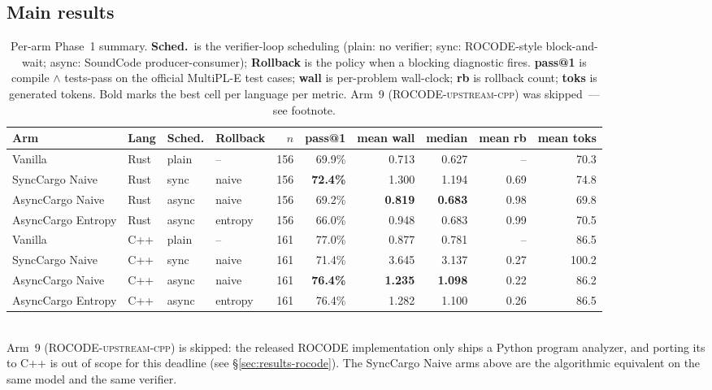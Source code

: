 \subsection{Main results}\label{sec:main-results}

\begin{table}[t]
\centering
\small
\setlength{\tabcolsep}{3.5pt}
\caption{Per-arm Phase~1 summary. \textbf{Sched.}\ is the
verifier-loop scheduling (\textsf{plain}: no verifier; \textsf{sync}:
ROCODE-style block-and-wait; \textsf{async}: SoundCode
producer-consumer); \textbf{Rollback} is the policy when a blocking
diagnostic fires. \textbf{pass@1} is compile $\wedge$ tests-pass on
the official MultiPL-E test cases; \textbf{wall} is per-problem
wall-clock; \textbf{rb} is rollback count; \textbf{toks} is generated
tokens. Bold marks the best cell per language per metric. Arm~9
(\textsc{ROCODE-upstream-cpp}) was skipped~--- see footnote.}
\label{tab:main}
\begin{tabular}{llllrrrrrr}
\toprule
Arm & Lang & Sched. & Rollback & $n$ & pass@1 & mean wall & median & mean rb & mean toks \\
\midrule
Vanilla            & Rust & plain  & --      & 156 & 69.9\%          & 0.713          & 0.627          & --   & 70.3 \\
SyncCargo Naive    & Rust & sync   & naive   & 156 & \textbf{72.4\%} & 1.300          & 1.194          & 0.69 & 74.8 \\
AsyncCargo Naive   & Rust & async  & naive   & 156 & 69.2\%          & \textbf{0.819} & \textbf{0.683} & 0.98 & 69.8 \\
AsyncCargo Entropy & Rust & async  & entropy & 156 & 66.0\%          & 0.948          & 0.683          & 0.99 & 70.5 \\
\midrule
Vanilla            & C++  & plain  & --      & 161 & 77.0\%          & 0.877          & 0.781          & --   & 86.5 \\
SyncCargo Naive    & C++  & sync   & naive   & 161 & 71.4\%          & 3.645          & 3.137          & 0.27 & 100.2 \\
AsyncCargo Naive   & C++  & async  & naive   & 161 & \textbf{76.4\%} & \textbf{1.235} & \textbf{1.098} & 0.22 & 86.2 \\
AsyncCargo Entropy & C++  & async  & entropy & 161 & 76.4\%          & 1.282          & 1.100          & 0.26 & 86.5 \\
\bottomrule
\end{tabular}
\\[2pt]
{\footnotesize Arm~9 (\textsc{ROCODE-upstream-cpp}) is skipped: the
released ROCODE implementation only ships a Python program analyzer,
and porting its  to C++ is out of scope for this
deadline (see \S\ref{sec:results-rocode}). The \textsf{SyncCargo
Naive} arms above are the algorithmic equivalent on the same model
and the same verifier.}
\end{table}

